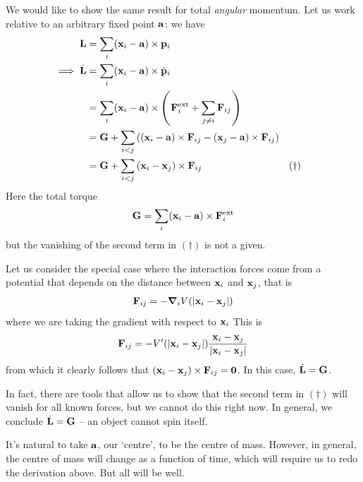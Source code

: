 \documentclass{../template/note}
\begin{document}
    We would like to show the same result for total \emph{angular} momentum. Let us work relative to an arbitrary fixed point \(\V a\): we have
    \begin{align*}
        \V L &= \sum_i (\V x_i - \V a) \times \V p_i \\
        \implies \dot{\V L} &= \sum_i (\V x_i - \V a) \times \dot{\V p}_i \\
        &= \sum_i (\V x_i - \V a) \times \left(\V F_i^\text{ext} + \sum_{j \neq i}\V F_{ij}\right) \\
        &= \V G + \sum_{i < j}\left((\V x_i - \V a) \times \V F_{ij} - (\V x_j - \V a) \times \V F_{ij} \right) \\
        &= \V G + \sum_{i < j}\left(\V x_i - \V x_j\right)\times\V F_{ij} && (\dagger)
    \end{align*}
    Here the total torque 
    \begin{align*}
        \V G = \sum_i (\V x_i - \V a) \times \V F_i^\text{ext}
    \end{align*}
    but the vanishing of the second term in \((\dagger)\) is not a given.  
    
    Let us consider the special case where the interaction forces come from a potential that depends on the distance between \(\V x_i\) and \(\V x_j\), that is
    \begin{align*}
        \V F_{ij} = -\grad_i V(|\V x_i - \V x_j|)
    \end{align*}
    where we are taking the gradient with respect to \(\V x_i\) This is
    \begin{align*}
        \V F_{ij} = -V'(|\V x_i - \V x_j|)\frac{\V x_i - \V x_j}{|\V x_i - \V x_j|}
    \end{align*}
    from which it clearly follows that \((\V x_i - \V x_j) \times \V F_{ij} = \vec 0\). In this case, \(\dot{\V L} = \V G\).

    In fact, there are tools that allow us to show that the second term in \((\dagger)\) will vanish for all known forces, but we cannot do this right now. In general, we conclude \(\dot{\V L} = \V G\) -- an object cannot spin itself.

    It's natural to take \(\V a\), our `centre', to be the centre of mass. However, in general, the centre of mass will change as a function of time, which will require us to redo the derivation above. But all will be well.
\end{document}
